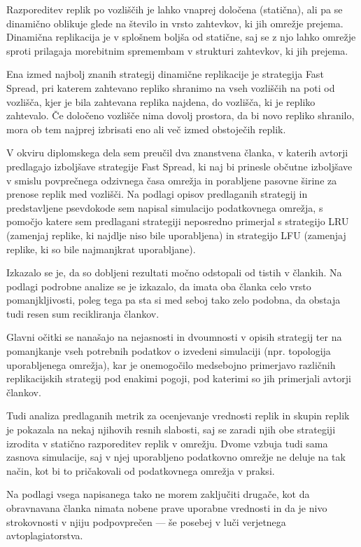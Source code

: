 \documentclass[a4paper, 12pt]{book}
\begin{document}
Razporeditev replik po vozliščih je lahko vnaprej določena (statična), ali
pa se dinamično oblikuje glede na število in vrsto zahtevkov, ki jih omrežje
prejema. Dinamična replikacija je v splošnem boljša od statične, saj se
z njo lahko omrežje sproti prilagaja morebitnim spremembam v strukturi
zahtevkov, ki jih prejema.

Ena izmed najbolj znanih strategij dinamične replikacije je strategija
Fast Spread, pri katerem zahtevano repliko shranimo na vseh vozliščih na
poti od vozlišča, kjer je bila zahtevana replika najdena, do vozlišča, ki
je repliko zahtevalo. Če določeno vozlišče nima dovolj prostora, da
bi novo repliko shranilo, mora ob tem najprej izbrisati eno ali več
izmed obstoječih replik.

V okviru diplomskega dela sem preučil dva znanstvena članka, v katerih avtorji
predlagajo izboljšave strategije Fast Spread, ki naj bi prinesle občutne
izboljšave v smislu povprečnega odzivnega časa omrežja in porabljene
pasovne širine za prenose replik med vozlišči. Na podlagi opisov predlaganih
strategij in predstavljene psevdokode sem napisal simulacijo podatkovnega
omrežja, s pomočjo katere sem predlagani strategiji neposredno primerjal s
strategijo LRU (zamenjaj replike, ki najdlje niso bile uporabljena) in
strategijo LFU (zamenjaj replike, ki so bile najmanjkrat uporabljane).

Izkazalo se je, da so dobljeni rezultati močno odstopali od tistih v člankih.
Na podlagi podrobne analize se je izkazalo, da imata oba članka celo vrsto
pomanjkljivosti, poleg tega pa sta si med seboj tako zelo podobna, da
obstaja tudi resen sum recikliranja člankov.

Glavni očitki se nanašajo na nejasnosti in dvoumnosti v opisih strategij
ter na pomanjkanje vseh potrebnih podatkov o izvedeni simulaciji (npr.
topologija uporabljenega omrežja), kar je onemogočilo medsebojno primerjavo
različnih replikacijskih strategij pod enakimi pogoji, pod katerimi so jih
primerjali avtorji člankov.

Tudi analiza predlaganih metrik za ocenjevanje vrednosti replik in skupin
replik je pokazala na nekaj njihovih resnih slabosti, saj se zaradi njih
obe strategiji izrodita v statično razporeditev replik v omrežju. Dvome
vzbuja tudi sama zasnova simulacije, saj v njej uporabljeno podatkovno omrežje
ne deluje na tak način, kot bi to pričakovali od podatkovnega omrežja v
praksi.

Na podlagi vsega napisanega tako ne morem zaključiti drugače, kot da
obravnavana članka nimata nobene prave uporabne vrednosti in da je nivo
strokovnosti v njiju podpovprečen --- še posebej v luči verjetnega
avtoplagiatorstva.
\end{document}
